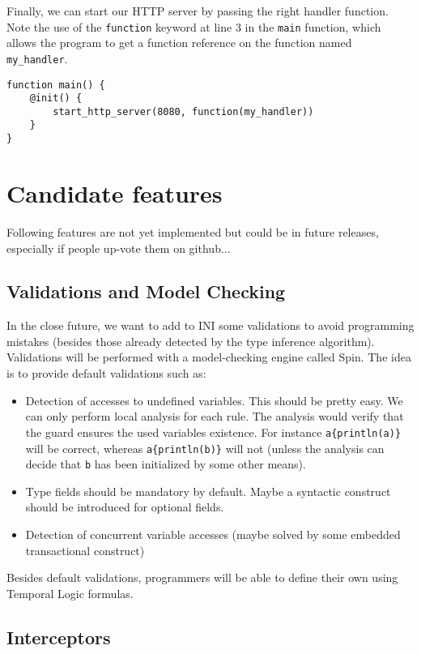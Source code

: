 \documentclass[11pt]{report}
\begin{document}
Finally, we can start our HTTP server by passing the right handler function. Note the use of the \texttt{function} keyword at line 3 in the \texttt{main} function, which allows the program to get a function reference on the function named \texttt{my\_handler}.

\begin{lstlisting}
function main() {
	@init() {
		start_http_server(8080, function(my_handler))
	}
}
\end{lstlisting}

\chapter{Candidate features}

Following features are not yet implemented but could be in future releases, especially if people up-vote them on github...

\section{Validations and Model Checking}

In the close future, we want to add to INI some validations to avoid programming mistakes (besides those already detected by the type inference algorithm). Validations will be performed with a model-checking engine called Spin. The idea is to provide default validations such as:

\begin{itemize}
\item Detection of accesses to undefined variables. This should be pretty easy. We can only perform local analysis for each rule. The analysis would verify that the guard ensures the used variables existence. For instance \texttt{a\{println(a)\}} will be correct, whereas \texttt{a\{println(b)\}} will not (unless the analysis can decide that \texttt{b} has been initialized by some other means).
\item Type fields should be mandatory by default. Maybe a syntactic construct should be introduced for optional fields.
\item Detection of concurrent variable accesses (maybe solved by some embedded transactional construct)
\end{itemize}

Besides default validations, programmers will be able to define their own using Temporal Logic formulas.

\section{Interceptors}
\end{document}
